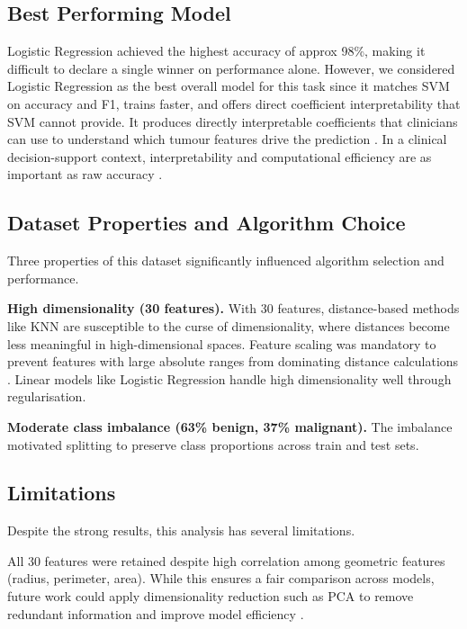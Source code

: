 \documentclass[twocolumn, fontsize=10pt]{article}
\begin{document}
\subsection{Best Performing Model}

Logistic Regression achieved the highest accuracy of approx 98\%, making it difficult to declare a single winner on performance alone. However, we considered Logistic Regression as the best overall model for this task since it matches SVM 
on accuracy and F1, trains faster, and offers direct coefficient interpretability that SVM cannot provide. It produces directly interpretable coefficients that clinicians can use to understand which tumour features drive the prediction \citep{bishop2006pattern}. In a clinical decision-support context, interpretability and computational efficiency are as important as raw accuracy \citep{james2021statistical}.

\subsection{Dataset Properties and Algorithm Choice}

Three properties of this dataset significantly influenced algorithm selection and performance.

\textbf{High dimensionality (30 features).} With 30 features, distance-based methods like KNN are susceptible to the curse of dimensionality, where distances become less meaningful in high-dimensional spaces. Feature scaling was mandatory to prevent features with large absolute ranges from dominating distance calculations \citep{hastie2009elements}. Linear models like Logistic Regression handle high dimensionality well through regularisation.


\textbf{Moderate class imbalance (63\% benign, 37\% malignant).} The imbalance motivated splitting to preserve class proportions across train and test sets.


\subsection{Limitations}

Despite the strong results, this analysis has several limitations.

All 30 features were retained despite high correlation among geometric features (radius, perimeter, area). While this ensures a fair comparison across models, future work could apply dimensionality reduction such as PCA to remove redundant information and improve model efficiency \citep{james2021statistical}.
\end{document}

